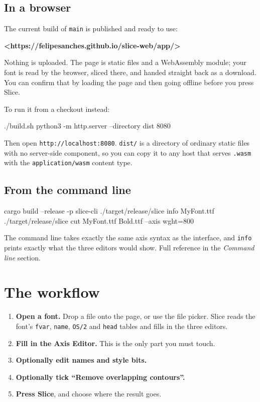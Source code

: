 \documentclass[11pt,a4paper]{article}
\begin{document}
\subsection{In a browser}

The current build of \texttt{main} is published and ready to use:

\textbf{<https://felipesanches.github.io/slice-web/app/>}

Nothing is uploaded. The page is static files and a WebAssembly module; your font is read by the browser, sliced there, and handed straight back as a download. You can confirm that by loading the page and then going offline before you press Slice.

To run it from a checkout instead:

\begin{code}
./build.sh
python3 -m http.server --directory dist 8080
\end{code}

Then open \texttt{http://localhost:8080}. \texttt{dist/} is a directory of ordinary static files with no server-side component, so you can copy it to any host that serves \texttt{.wasm} with the \texttt{application/wasm} content type.

\subsection{From the command line}

\begin{code}
cargo build --release -p slice-cli
./target/release/slice info MyFont.ttf
./target/release/slice cut MyFont.ttf Bold.ttf --axis wght=800
\end{code}

The command line takes exactly the same axis syntax as the interface, and \texttt{info} prints exactly what the three editors would show. Full reference in the \emph{Command line} section.

\section{The workflow}

\begin{enumerate}
  \item \textbf{Open a font.} Drop a file onto the page, or use the file picker. Slice reads the font's \texttt{fvar}, \texttt{name}, \texttt{OS/2} and \texttt{head} tables and fills in the three editors.
  \item \textbf{Fill in the Axis Editor.} This is the only part you must touch.
  \item \textbf{Optionally edit names and style bits.}
  \item \textbf{Optionally tick ``Remove overlapping contours''.}
  \item \textbf{Press Slice}, and choose where the result goes.
\end{enumerate}
\end{document}
